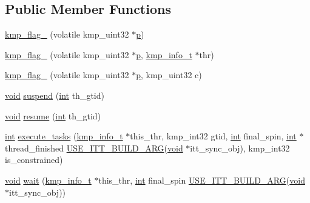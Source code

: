 \subsection*{Public Member Functions}
\begin{DoxyCompactItemize}
\item 
\hyperlink{classkmp__flag__32_a0d822138677c1dbc93115fabc143461e}{kmp\-\_\-flag\-\_} (volatile kmp\-\_\-uint32 $\ast$\hyperlink{ittnotify__static_8h_ab7caea589d3ca96f9f11c78f10bff578}{p})
\item 
\hyperlink{classkmp__flag__32_ae2faeae32e4b1ed56e9287ffb410934c}{kmp\-\_\-flag\-\_} (volatile kmp\-\_\-uint32 $\ast$\hyperlink{ittnotify__static_8h_ab7caea589d3ca96f9f11c78f10bff578}{p}, \hyperlink{kmp_8h_a194859801fe16b326efe34501a37c30a}{kmp\-\_\-info\-\_\-t} $\ast$thr)
\item 
\hyperlink{classkmp__flag__32_a9b05ae4c5cd703fd250512448bc3dac4}{kmp\-\_\-flag\-\_} (volatile kmp\-\_\-uint32 $\ast$\hyperlink{ittnotify__static_8h_ab7caea589d3ca96f9f11c78f10bff578}{p}, kmp\-\_\-uint32 c)
\item 
\hyperlink{ittnotify__static_8h_af941d56e55e3c5465135b60c4d6343ed}{void} \hyperlink{classkmp__flag__32_a3a7d371bf8201034e96c2cfd8e5fe30a}{suspend} (\hyperlink{ittnotify__static_8h_a8b8dcd723308a8cb5d84277c7a3fff70}{int} th\-\_\-gtid)
\item 
\hyperlink{ittnotify__static_8h_af941d56e55e3c5465135b60c4d6343ed}{void} \hyperlink{classkmp__flag__32_a3c8777315b710987f5214ecb3d89d745}{resume} (\hyperlink{ittnotify__static_8h_a8b8dcd723308a8cb5d84277c7a3fff70}{int} th\-\_\-gtid)
\item 
\hyperlink{ittnotify__static_8h_a8b8dcd723308a8cb5d84277c7a3fff70}{int} \hyperlink{classkmp__flag__32_a60c72c91f420d8034d6aee0e9fa1424d}{execute\-\_\-tasks} (\hyperlink{kmp_8h_a194859801fe16b326efe34501a37c30a}{kmp\-\_\-info\-\_\-t} $\ast$this\-\_\-thr, kmp\-\_\-int32 gtid, \hyperlink{ittnotify__static_8h_a8b8dcd723308a8cb5d84277c7a3fff70}{int} final\-\_\-spin, \hyperlink{ittnotify__static_8h_a8b8dcd723308a8cb5d84277c7a3fff70}{int} $\ast$thread\-\_\-finished \hyperlink{kmp__itt_8h_ac31864b9b5b30f5dcac5ab285ee97ae0}{U\-S\-E\-\_\-\-I\-T\-T\-\_\-\-B\-U\-I\-L\-D\-\_\-\-A\-R\-G}(\hyperlink{ittnotify__static_8h_af941d56e55e3c5465135b60c4d6343ed}{void} $\ast$itt\-\_\-sync\-\_\-obj), kmp\-\_\-int32 is\-\_\-constrained)
\item 
\hyperlink{ittnotify__static_8h_af941d56e55e3c5465135b60c4d6343ed}{void} \hyperlink{classkmp__flag__32_a5eb7b113d70f5fbf581efe086663292c}{wait} (\hyperlink{kmp_8h_a194859801fe16b326efe34501a37c30a}{kmp\-\_\-info\-\_\-t} $\ast$this\-\_\-thr, \hyperlink{ittnotify__static_8h_a8b8dcd723308a8cb5d84277c7a3fff70}{int} final\-\_\-spin \hyperlink{kmp__itt_8h_ac31864b9b5b30f5dcac5ab285ee97ae0}{U\-S\-E\-\_\-\-I\-T\-T\-\_\-\-B\-U\-I\-L\-D\-\_\-\-A\-R\-G}(\hyperlink{ittnotify__static_8h_af941d56e55e3c5465135b60c4d6343ed}{void} $\ast$itt\-\_\-sync\-\_\-obj))

\end{DoxyCompactItemize}
